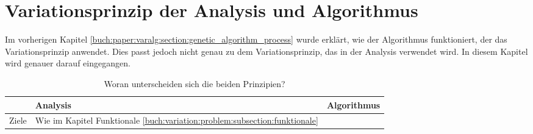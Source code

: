%
%
%
%
\section{Variationsprinzip der Analysis und Algorithmus
\label{buch:paper:varalg:section:variations_analysis_algorithm_result}}
Im vorherigen Kapitel \ref{buch:paper:varalg:section:genetic_algorithm_process} wurde erklärt, 
wie der Algorithmus funktioniert, der das Variationsprinzip anwendet. Dies 
passt jedoch nicht genau zu dem Variationsprinzip, das in der Analysis 
verwendet wird. In diesem Kapitel wird genauer darauf eingegangen.

\begin{table}
   \centering
   \caption{Woran unterscheiden sich die beiden Prinzipien?}
   \begin{tabularx}{\textwidth}{|X|X|X|}
      \hline
       & Analysis 
       & Algorithmus 
       \\ \hline
      Ziele  
       & Wie im Kapitel Funktionale \ref{buch:variation:problem:subsection:funktionale}


\end{tabularx}
\end{table}

